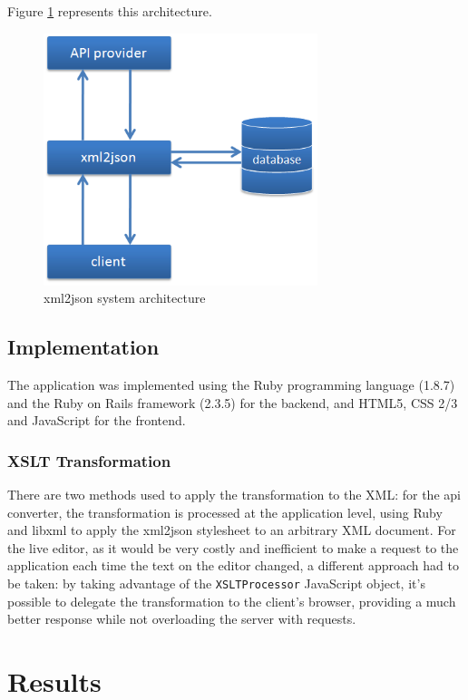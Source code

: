 \documentclass[twocolumn,twoside,10pt,a4paper]{article}
\begin{document}
Figure \ref{fig:system_arch} represents this architecture.

\begin{figure}[h]
    \centering
    \includegraphics[width=80mm]{images/arch.png}
    \caption{xml2json system architecture}
    \label{fig:system_arch}
\end{figure}

\subsection{Implementation}\label{sec:implementation}

The application was implemented using the Ruby programming language (1.8.7) and the Ruby on Rails framework (2.3.5) for the backend, and HTML5, CSS 2/3 and JavaScript for the frontend.

\subsubsection{XSLT Transformation}\label{sec:xslt-transformation}

There are two methods used to apply the transformation to the XML: for the api converter, the transformation is processed at the application level, using Ruby and libxml to apply the xml2json stylesheet to an arbitrary XML document. For the live editor, as it would be very costly and inefficient to make a request to the application each time the text on the editor changed, a different approach had to be taken: by taking advantage of the \verb!XSLTProcessor! JavaScript object, it's possible to delegate the transformation to the client's browser, providing a much better response while not overloading the server with requests.

\section{Results}\label{sec:results}
\end{document}
